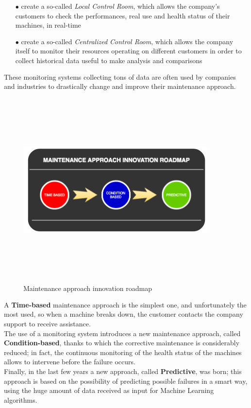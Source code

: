 \documentclass[12pt]{report}
\begin{document}
{\begin{itemize}
\setlength{\itemindent}{+4mm}
\item[$\bullet$] create a so-called \textit{Local Control Room}, which allows the company's customers to check the performances, real use and health status of their machines, in real-time
\item[$\bullet$] create a so-called \textit{Centralized Control Room}, which allows the company itself to monitor their resources operating on different customers in order to collect historical data useful to make analysis and comparisons
\end{itemize}

These monitoring systems collecting tons of data are often used by companies and industries to drastically change and improve their maintenance approach.

\begin{figure}[H]
\includegraphics[width=10cm,height=10cm,keepaspectratio]{maintenance_approach}
\centering
\caption{Maintenance approach innovation roadmap}
\end{figure}

A \textbf{Time-based} maintenance approach is the simplest one, and unfortunately the most used, so when a machine breaks down, the customer contacts the company support to receive assistance.\\
The use of a monitoring system introduces a new maintenance approach, called \textbf{Condition-based}, thanks to which the corrective maintenance is considerably reduced; in fact, the continuous monitoring of the health status of the machines allows to intervene before the failure occurs.\\
Finally, in the last few years a new approach, called \textbf{Predictive}, was born; this approach is based on the possibility of predicting possible failures in a smart way, using the huge amount of data received as input for Machine Learning algorithms.\\

}
\end{document}
